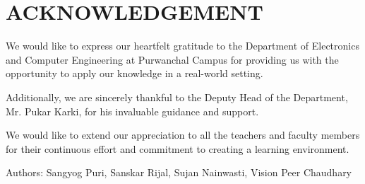 \chapter*{ACKNOWLEDGEMENT}

We would like to express our heartfelt gratitude to the Department of Electronics and Computer Engineering at Purwanchal Campus for providing us with the opportunity to apply our knowledge in a real-world setting.

Additionally, we are sincerely thankful to the Deputy Head of the Department, Mr. Pukar Karki, for his invaluable guidance and support.

We would like to extend our appreciation to all the teachers and faculty members for their continuous effort and commitment to creating a learning environment.

\vspace{1cm}
Authors: Sangyog Puri, Sanskar Rijal, Sujan Nainwasti, Vision Peer Chaudhary